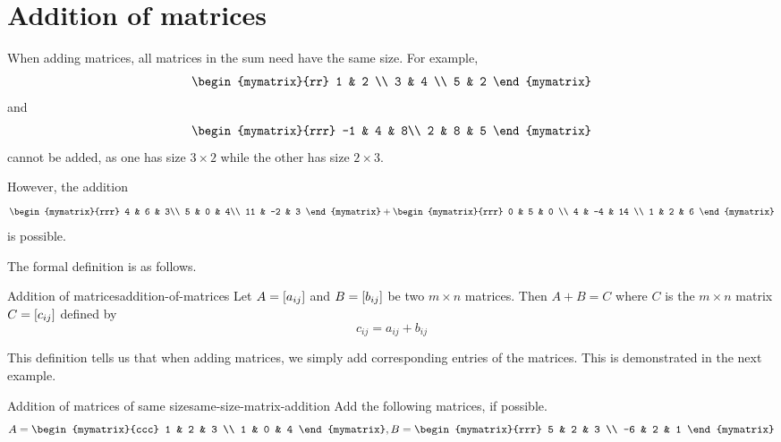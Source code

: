 \section{Addition of matrices}

When adding matrices, all matrices in the sum need have the same size.
For example,
\begin{equation*}
\begin{mymatrix}{rr}
1 & 2 \\
3 & 4 \\
5 & 2
\end{mymatrix} 
\end{equation*}
and
\begin{equation*}
\begin{mymatrix}{rrr}
-1 & 4 & 8\\
2 & 8 & 5
\end{mymatrix} 
\end{equation*}
cannot be added, as one has size $3 \times 2$ while the other has size $2 \times 3$.

However, the addition
\begin{equation*}
\begin{mymatrix}{rrr}
4 & 6 & 3\\
5 & 0 & 4\\
11 & -2 & 3
\end{mymatrix} 
+
\begin{mymatrix}{rrr}
0 & 5 & 0 \\
4 & -4 & 14 \\
1 & 2 & 6
\end{mymatrix}
\end{equation*}
is possible.

The formal definition is as follows.

\begin{definition}{Addition of matrices}{addition-of-matrices}
Let $A=\left[a_{ij}\right] $ and $B=\left[b_{ij}\right] $ be two
$m\times n$ matrices. Then $A+B=C$ where $C$ is the $m \times n$
matrix $C=\left[c_{ij}\right]$ defined by
\begin{equation*}
c_{ij}=a_{ij}+b_{ij}
\end{equation*}

\end{definition}

This definition tells us that when adding matrices, we simply add corresponding entries of the matrices. 
This is demonstrated in the next example. 

\begin{example}{Addition of matrices of same size}{same-size-matrix-addition}
Add the following matrices, if possible.
\begin{equation*}
A = \begin{mymatrix}{ccc}
1 & 2 & 3 \\
1 & 0 & 4
\end{mymatrix},
B = \begin{mymatrix}{rrr}
5 & 2 & 3 \\
-6 & 2 & 1
\end{mymatrix}
\end{equation*}
\end{example}

